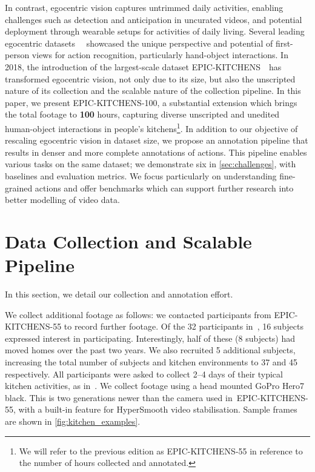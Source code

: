 \RequirePackage{amsmath} \documentclass[runningheads]{llncs}
\newcommand{\chParagraph}[1]{\noindent {\textbf{#1.}} \hspace{6pt}}
\newcommand {\oldDataset} {EPIC-KITCHENS-55{}}
\newcommand {\newDataset} {EPIC-KITCHENS-100}
\begin{document}
In contrast, egocentric vision captures untrimmed daily activities, enabling challenges such as detection and anticipation in uncurated videos, and potential deployment through wearable setups for activities of daily living.
Several leading egocentric datasets~~\cite{Pirsiavash2012,Damen2014a,Fathi2012,de2008guide,EGTEA} showcased the unique perspective and potential of first-person views for action recognition, particularly hand-object interactions.
In 2018, the introduction of the largest-scale dataset EPIC-KITCHENS~\cite{Damen2018EPICKITCHENS}\ has transformed egocentric vision, not only due to its size, but also the unscripted nature of its collection and the scalable nature of the collection pipeline.
In this paper, we present \newDataset, a substantial extension which brings the total footage to \textbf{100} hours, capturing diverse unscripted and unedited human-object interactions in people's kitchens\footnote{We will refer to the previous edition as EPIC-KITCHENS-55 in reference to the number of hours collected and annotated.}. 
In addition to our objective of rescaling egocentric vision in dataset size, we propose an annotation pipeline that results in denser and more complete annotations of actions. This pipeline enables various tasks on the same dataset; we demonstrate six in \cref{sec:challenges}, with baselines and evaluation metrics. 
We focus particularly on understanding fine-grained actions and offer benchmarks which can support further research into better modelling of video data.


\section{Data Collection and Scalable Pipeline}
\label{sec:data_collection_pipeline}
In this section, we detail our collection and annotation effort. 

\chParagraph{Data Collection}
We collect additional footage as follows:
we contacted participants from \oldDataset{} to record further footage.
Of the 32 participants in~\cite{Damen2018EPICKITCHENS}, 16 subjects expressed interest in participating. Interestingly, half of these (8 subjects) had moved homes over the past two years.
We also recruited 5 additional subjects, increasing the total number of subjects and kitchen environments to 37 and 45 respectively.
All participants were asked to collect 2--4 days of their typical kitchen activities, as in~\cite{Damen2018EPICKITCHENS}.
We collect footage using a head mounted GoPro Hero7 black. This is two generations newer than the camera used in~\oldDataset, with a built-in feature for HyperSmooth video stabilisation. 
Sample frames are shown in \cref{fig:kitchen_examples}.
\end{document}
